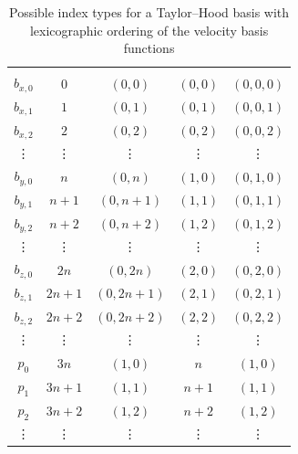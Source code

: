 \documentclass[a4paper,10pt,headings=normal,bibliography=totoc]{scrartcl}
\begin{document}
\begin{table}
 \begin{center}
 \begin{tabular}{c|c|c|c|c}
 \hline \\
  $b_{x,0}$  & $0$    & $(0,0)$ & $(0,0)$ & $(0,0,0)$ \\
  $b_{x,1}$  & $1$    & $(0,1)$ & $(0,1)$ & $(0,0,1)$ \\
  $b_{x,2}$  & $2$    & $(0,2)$ & $(0,2)$ & $(0,0,2)$ \\
    \vdots   & \vdots & \vdots  & \vdots  & \vdots  \\
  $b_{y,0}$  & $n$    & $(0,n)$ & $(1,0)$ & $(0,1,0)$ \\
  $b_{y,1}$  & $n+1$  & $(0,n+1)$ & $(1,1)$ & $(0,1,1)$ \\
  $b_{y,2}$  & $n+2$  & $(0,n+2)$ & $(1,2)$ & $(0,1,2)$ \\
    \vdots   & \vdots & \vdots  & \vdots  & \vdots  \\
  $b_{z,0}$  & $2n$   & $(0,2n)$ & $(2,0)$ & $(0,2,0)$ \\
  $b_{z,1}$  & $2n+1$ & $(0,2n+1)$ & $(2,1)$ & $(0,2,1)$ \\
  $b_{z,2}$  & $2n+2$ & $(0,2n+2)$ & $(2,2)$ & $(0,2,2)$ \\
    \vdots   & \vdots & \vdots  & \vdots  & \vdots  \\
  $p_0$      & $3n$   & $(1,0)$ & $n$ & $(1,0)$ \\
  $p_1$      & $3n+1$ & $(1,1)$ & $n+1$ & $(1,1)$ \\
  $p_2$      & $3n+2$ & $(1,2)$ & $n+2$ & $(1,2)$ \\
    \vdots   & \vdots & \vdots  & \vdots  & \vdots
 \end{tabular}
 \end{center}
 \caption{Possible index types for a Taylor--Hood basis with lexicographic ordering of the velocity basis functions}
 \label{tbl:th_multiindices_lexicographic}
\end{table}
\end{document}
